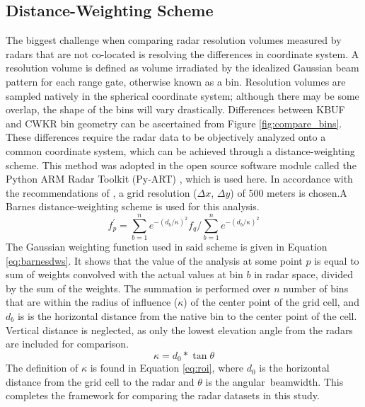 \subsection{Distance-Weighting Scheme}
The biggest challenge when comparing radar resolution volumes measured by radars that are not co-located is resolving the differences in coordinate system. A
resolution volume is defined as volume irradiated by the idealized Gaussian beam pattern for each range gate, otherwise known as a bin. Resolution volumes
are sampled natively in the spherical coordinate system; although there may be some overlap, the shape of the bins will vary drastically. Differences between
KBUF and CWKR bin geometry can be ascertained from Figure \ref{fig:compare_bins}. 
These differences require the radar data to be objectively analyzed onto a common coordinate system, which can be achieved through a distance-weighting
scheme. This method was adopted in the open source software module called the Python ARM Radar Toolkit (Py-ART) \citep{Py-ART}, which is used here. In
accordance with the recommendations of \cite{Pauly1990}, a grid resolution ($\Delta x$, $\Delta y$) of 500 meters is chosen.A Barnes distance-weighting scheme is used for this analysis. 
\begin{equation}\label{eq:barnesdws}
f^{'}_{p} = \sum_{b=1}^n  e^{-(d_b/\kappa)^{2}} f_q  \bigg/ \sum_{b=1}^n e^{-(d_b/\kappa)^{2}}
\end{equation}
The Gaussian weighting function used in said scheme is given in Equation \ref{eq:barnesdws}. It shows that the value of the analysis at some point $p$ is
equal to sum of weights convolved with the actual values at bin $b$ in radar space, divided by the sum of the weights. The summation is performed over $n$
number of bins that are within the radius of influence ($\kappa$) of the center point of the grid cell, and $d_{b}$ is is the horizontal distance from the native
bin to the center point of the cell. Vertical distance is neglected, as only the lowest elevation angle from the radars are included for comparison.
\begin{equation}\label{eq:roi}
\kappa = d_{0} * \tan{\theta}
\end{equation}
The definition of $\kappa$ is found in Equation \ref{eq:roi}, where $d_{0}$ is the horizontal distance from the grid cell to the radar and $\theta$ is the angular\
beamwidth. This completes the framework for comparing the radar datasets in this study.

